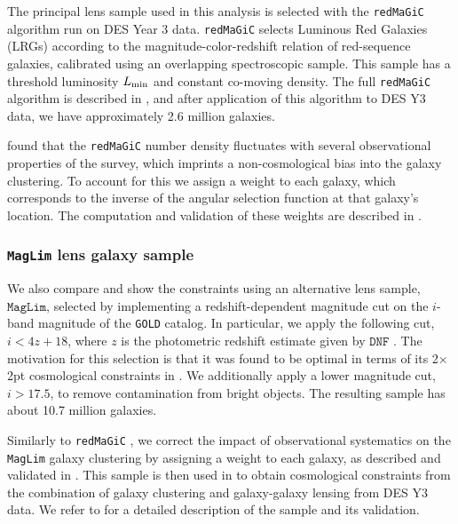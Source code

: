 \documentclass[aps, prd,twocolumn,superscriptaddress,nofootinbib,preprintnumbers]{revtex4-1}
\newcommand{\redmagic}{\texttt{redMaGiC} }
\newcommand{\maglim}{\texttt{MagLim} }
\newcommand{\gold}{\texttt{GOLD} }
\newcommand{\blue}[1]{\textcolor{blue}{#1}}
\begin{document}
The principal lens sample used in this analysis is selected with the \redmagic algorithm \citep{Rozo_2016} run on DES Year 3 data. \redmagic selects Luminous Red Galaxies (LRGs) according to the magnitude-color-redshift relation of red-sequence galaxies, calibrated using an overlapping spectroscopic sample.
This sample has a threshold luminosity $L_{\rm min}$ and constant co-moving density. The full \redmagic algorithm is described in \citet{Rozo_2016}, and after application of this algorithm to DES Y3 data, we have approximately 2.6 million galaxies.


\cite{y3-galaxyclustering} found that the \redmagic number density fluctuates with several observational properties of the survey, which imprints a non-cosmological bias into the galaxy clustering. To account for this we assign a weight to each galaxy, which corresponds to the inverse of the angular selection function at that galaxy's location. The computation and validation of these weights are described in \cite{y3-galaxyclustering}.  


\subsubsection{\maglim lens galaxy sample}

We also compare and show the constraints using an alternative lens sample, $\maglim$, selected by implementing a redshift-dependent magnitude cut on the $i$-band magnitude of the \gold catalog. In particular, we apply the following cut, $i < 4z+18$, where $z$ is the photometric redshift estimate given by $\texttt{DNF}$ \citep{DNF2016}. The motivation for this selection is that it was found to be optimal in terms of its 2$\times$2pt cosmological constraints in \citet*{y3-2x2maglimforecast}.
We additionally apply a lower magnitude cut, $i>17.5$, to remove contamination from bright objects. The resulting sample has about 10.7 million galaxies. 

Similarly to \redmagic, we correct the impact of observational systematics on the \maglim galaxy clustering by assigning a weight to each galaxy, as described and validated in \cite{y3-galaxyclustering}. This sample is then used in \citet*{y3-2x2ptaltlensresults} to obtain cosmological constraints from the combination of galaxy clustering and galaxy-galaxy lensing from DES Y3 data. We refer to \cite{y3-2x2ptaltlensresults} for a detailed description of the sample and its validation.
\end{document}
